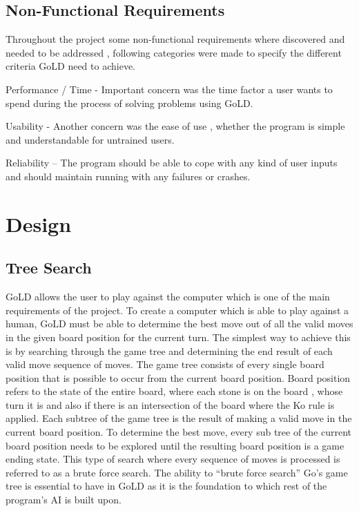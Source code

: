 \documentclass{l4proj}
\begin{document}
\section{Non-Functional Requirements}
Throughout the project some non-functional requirements where discovered and needed to be addressed , following categories were made to specify the different criteria GoLD need to achieve.

Performance / Time - Important concern was the time factor a user wants to spend during the process of solving problems using GoLD.

Usability - Another concern was the ease of use , whether the program is simple and understandable for untrained users.

Reliability – The program should be able to cope with any kind of user inputs and should maintain running with any failures or crashes.



\chapter{Design}


\section{Tree Search}
GoLD allows the user to play against the computer which is one of the main requirements of the project. To create a computer which is able to play against a human, GoLD must be able to determine the best move out of all the valid moves in the given board position for the current turn. The simplest way to achieve this is by searching through the game tree and determining the end result of each valid move sequence of moves. The game tree consists of every single board position that is possible to occur from the current board position. Board position refers to the state of the entire board, where each stone is on the board , whose turn it is and also if there is an intersection of the board where the Ko rule is applied. Each subtree of the game tree is the result of making a valid move in the current board position. To determine the best move, every sub tree of the current board position needs to be explored until the resulting board position is a game ending state. This type of search where every sequence of moves is processed is referred to as a brute force search. The ability to “brute force search” Go’s game tree is essential to have in GoLD as it is the foundation to which rest of the program’s AI is built upon.
\end{document}
